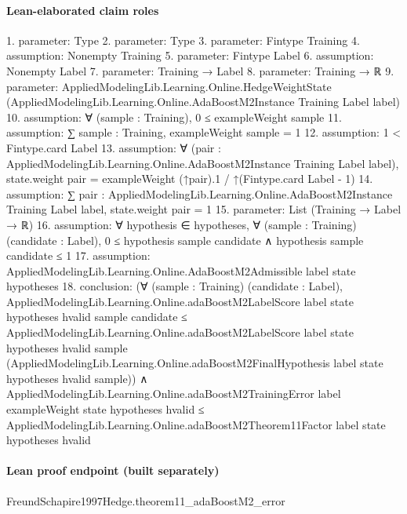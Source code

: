 \documentclass[10pt]{article}
\begin{document}
\paragraph{Lean-elaborated claim roles}\begin{ReviewVerbatim}
1. parameter: Type
2. parameter: Type
3. parameter: Fintype Training
4. assumption: Nonempty Training
5. parameter: Fintype Label
6. assumption: Nonempty Label
7. parameter: Training → Label
8. parameter: Training → ℝ
9. parameter: AppliedModelingLib.Learning.Online.HedgeWeightState
  (AppliedModelingLib.Learning.Online.AdaBoostM2Instance Training Label label)
10. assumption: ∀ (sample : Training), 0 ≤ exampleWeight sample
11. assumption: ∑ sample : Training, exampleWeight sample = 1
12. assumption: 1 < Fintype.card Label
13. assumption: ∀ (pair : AppliedModelingLib.Learning.Online.AdaBoostM2Instance Training Label label),
  state.weight pair = exampleWeight (↑pair).1 / ↑(Fintype.card Label - 1)
14. assumption: ∑ pair : AppliedModelingLib.Learning.Online.AdaBoostM2Instance Training Label label, state.weight pair = 1
15. parameter: List (Training → Label → ℝ)
16. assumption: ∀ hypothesis ∈ hypotheses,
  ∀ (sample : Training) (candidate : Label), 0 ≤ hypothesis sample candidate ∧ hypothesis sample candidate ≤ 1
17. assumption: AppliedModelingLib.Learning.Online.AdaBoostM2Admissible label state hypotheses
18. conclusion: (∀ (sample : Training) (candidate : Label),
    AppliedModelingLib.Learning.Online.adaBoostM2LabelScore label state hypotheses hvalid sample candidate ≤
      AppliedModelingLib.Learning.Online.adaBoostM2LabelScore label state hypotheses hvalid sample
        (AppliedModelingLib.Learning.Online.adaBoostM2FinalHypothesis label state hypotheses hvalid sample)) ∧
  AppliedModelingLib.Learning.Online.adaBoostM2TrainingError label exampleWeight state hypotheses hvalid ≤
    AppliedModelingLib.Learning.Online.adaBoostM2Theorem11Factor label state hypotheses hvalid
\end{ReviewVerbatim}

\paragraph{Lean proof endpoint (built separately)}\begin{ReviewVerbatim}
FreundSchapire1997Hedge.theorem11_adaBoostM2_error
\end{ReviewVerbatim}
\end{document}
